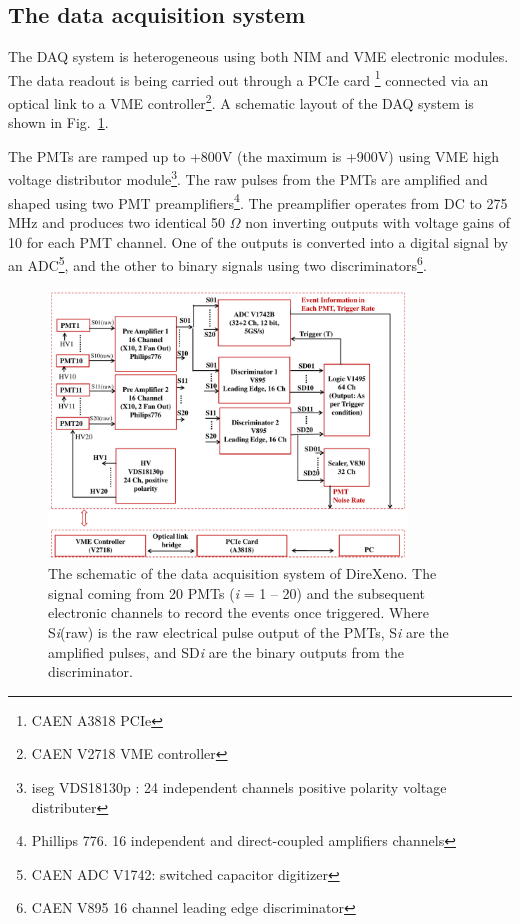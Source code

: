 \subsection{The data acquisition system }
\label{sec:DAQ}



The DAQ system is heterogeneous using both 
NIM and VME electronic modules. The data readout is being carried out through a PCIe card \footnote{CAEN A3818 PCIe}  connected via an optical link to a VME controller\footnote{CAEN V2718 VME controller}. A schematic layout of the DAQ system is shown in Fig.~{\ref{Fig:DAQscheme}}. 

The PMTs are ramped up to +800V (the maximum is +900V) using VME high voltage distributor module\footnote{iseg VDS18130p : 
24 independent channels positive polarity voltage distributer}. The raw pulses from the PMTs are amplified and shaped using 
two PMT preamplifiers\footnote{Phillips 776. 16 independent and direct-coupled amplifiers channels}. The preamplifier operates 
from DC to 275 MHz and produces two identical 50 $\Omega$ non inverting outputs with voltage gains of 10 for each PMT channel. One 
of the outputs is converted into a digital signal by an ADC\footnote{CAEN ADC V1742: switched capacitor digitizer}, and the other to 
binary signals using two discriminators\footnote{CAEN V895 16 channel leading edge discriminator}.

\begin{figure}[h]
   \centering
   \includegraphics[width=0.85\textwidth]{DAQscheme.pdf}
   \caption{The schematic of the data acquisition system of DireXeno. The signal coming from 20 PMTs ({\it i} = 1 -- 20) and the subsequent electronic channels to record the events once triggered. Where S{\it i}(raw) is the raw electrical pulse output of the PMTs, S{\it i} are the amplified pulses, and SD{\it i} are the binary outputs from the discriminator.
}
   \label{Fig:DAQscheme}
\end{figure}



